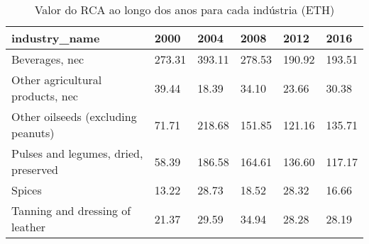 \begin{table}
\centering
\caption{Valor do RCA ao longo dos anos para cada indústria (ETH)}
\begin{tabular}{p{6cm}p{1.5cm}p{1.5cm}p{1.5cm}p{1.5cm}p{1.5cm}}
\toprule
                       industry\_name &   2000 &   2004 &   2008 &   2012 &   2016 \\
\midrule
                      Beverages, nec & 273.31 & 393.11 & 278.53 & 190.92 & 193.51 \\
    Other agricultural products, nec &  39.44 &  18.39 &  34.10 &  23.66 &  30.38 \\
  Other oilseeds (excluding peanuts) &  71.71 & 218.68 & 151.85 & 121.16 & 135.71 \\
Pulses and legumes, dried, preserved &  58.39 & 186.58 & 164.61 & 136.60 & 117.17 \\
                              Spices &  13.22 &  28.73 &  18.52 &  28.32 &  16.66 \\
     Tanning and dressing of leather &  21.37 &  29.59 &  34.94 &  28.28 &  28.19 \\
\bottomrule
\end{tabular}
\end{table}
